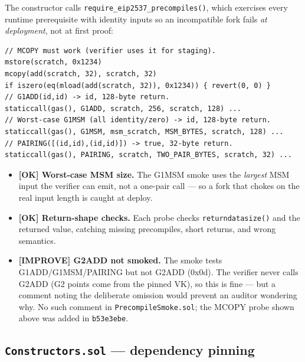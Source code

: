 The constructor calls \texttt{require\_\allowbreak{}eip2537\_\allowbreak{}precompiles()}, which
exercises every runtime prerequisite with identity inputs so an
incompatible fork fails \emph{at deployment}, not at first proof:
\begin{lstlisting}[style=plain]
// MCOPY must work (verifier uses it for staging).
mstore(scratch, 0x1234)
mcopy(add(scratch, 32), scratch, 32)
if iszero(eq(mload(add(scratch, 32)), 0x1234)) { revert(0, 0) }
// G1ADD(id,id) -> id, 128-byte return.
staticcall(gas(), G1ADD, scratch, 256, scratch, 128) ...
// Worst-case G1MSM (all identity/zero) -> id, 128-byte return.
staticcall(gas(), G1MSM, msm_scratch, MSM_BYTES, scratch, 128) ...
// PAIRING([(id,id),(id,id)]) -> true, 32-byte return.
staticcall(gas(), PAIRING, scratch, TWO_PAIR_BYTES, scratch, 32) ...
\end{lstlisting}
\begin{itemize}
  \item \textcolor{tracegreen}{\textbf{[OK] Worst-case MSM size.}} The
        G1MSM smoke uses the \emph{largest} MSM input the verifier can
        emit, not a one-pair call --- so a fork that chokes on the real
        input length is caught at deploy.
  \item \textcolor{tracegreen}{\textbf{[OK] Return-shape checks.}} Each
        probe checks \texttt{returndatasize()} and the returned value,
        catching missing precompiles, short returns, and wrong semantics.
  \item \textcolor{codegenblue}{\textbf{[IMPROVE] G2ADD not smoked.}}
        The smoke tests G1ADD/G1MSM/PAIRING but not G2ADD (0x0d). The
        verifier never calls G2ADD (G2 points come from the pinned VK),
        so this is fine --- but a comment noting the deliberate omission
        would prevent an auditor wondering why.  No such
        comment in \texttt{PrecompileSmoke.sol}; the MCOPY probe shown
        above was added in \texttt{b53e3ebe}.
\end{itemize}

\subsection{\texttt{Constructors.sol} --- dependency pinning}
\label{sec:constructors}

